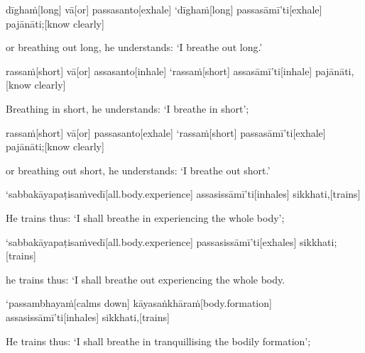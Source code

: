 \begin{samepage}
\begingl[glneveryline={\PaliGlossA,\PaliGlossB}]
dīghaṁ[long] vā[or] passasanto[exhale] ‘dīghaṁ[long] passasāmī’ti[exhale] pajānāti;[know clearly]
\endgl
\nopagebreak
\linespread{0.5}
\begin{spacin}{0.2}
{\PaliGlossFT or breathing out long, he understands: ‘I breathe out long.’}
\end{spacin}
\vskip 12pt
\end{samepage}
\begin{samepage}
\begingl[glneveryline={\PaliGlossA,\PaliGlossB}]
rassaṁ[short] vā[or] assasanto[inhale] ‘rassaṁ[short] assasāmī’ti[inhale] pajānāti,[know clearly]
\endgl
\nopagebreak
\linespread{0.5}
\begin{spacin}{0.2}
{\PaliGlossFT Breathing in short, he understands: ‘I breathe in short’;}
\end{spacin}
\vskip 12pt
\end{samepage}
\begin{samepage}
\begingl[glneveryline={\PaliGlossA,\PaliGlossB}]
rassaṁ[short] vā[or] passasanto[exhale] ‘rassaṁ[short] passasāmī’ti[exhale] pajānāti;[know clearly]
\endgl
\nopagebreak
\linespread{0.5}
\begin{spacin}{0.2}
{\PaliGlossFT or breathing out short, he understands: ‘I breathe out short.’}
\end{spacin}
\vskip 12pt
\end{samepage}
\begin{samepage}
\begingl[glneveryline={\PaliGlossA,\PaliGlossB}]
‘sabbakāyapaṭisaṁvedī[all.body.experience] assasissāmī’ti[inhales] sikkhati,[trains]
\endgl
\nopagebreak
\linespread{0.5}
\begin{spacin}{0.2}
{\PaliGlossFT He trains thus: ‘I shall breathe in experiencing the whole body’;}
\end{spacin}
\vskip 12pt
\end{samepage}
\begin{samepage}
\begingl[glneveryline={\PaliGlossA,\PaliGlossB}]
‘sabbakāyapaṭisaṁvedī[all.body.experience] passasissāmī’ti[exhales] sikkhati;[trains]
\endgl
\nopagebreak
\linespread{0.5}
\begin{spacin}{0.2}
{\PaliGlossFT he trains thus: ‘I shall breathe out experiencing the whole body.}
\end{spacin}
\vskip 12pt
\end{samepage}
\begin{samepage}
\begingl[glneveryline={\PaliGlossA,\PaliGlossB}]
‘passambhayaṁ[calms down] kāyasaṅkhāraṁ[body.formation] assasissāmī’ti[inhales] sikkhati,[trains]
\endgl
\nopagebreak
\linespread{0.5}
\begin{spacin}{0.2}
{\PaliGlossFT He trains thus: ‘I shall breathe in tranquillising the bodily formation’;}
\end{spacin}
\vskip 12pt
\end{samepage}
